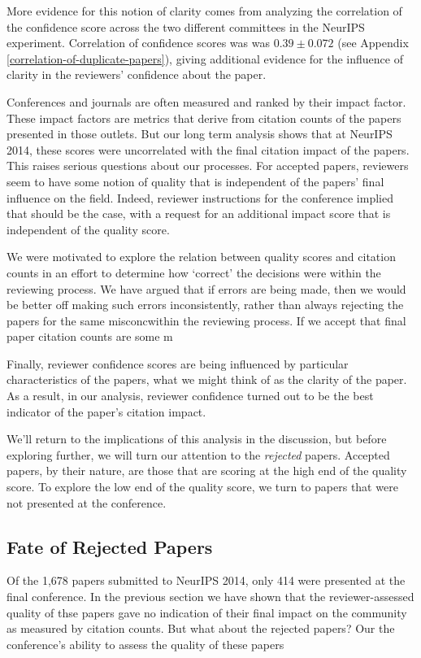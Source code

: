 \documentclass[twoside]{article}
\begin{document}
More evidence for this notion of clarity comes from analyzing the correlation of the confidence score across the two different committees in the NeurIPS experiment. Correlation of confidence scores was was $0.39 \pm 0.072$ (see Appendix \ref{correlation-of-duplicate-papers}), giving additional evidence for the influence of clarity in the reviewers' confidence about the paper.

Conferences and journals are often measured and ranked by their impact factor. These impact factors are metrics that derive from citation counts of the papers presented in those outlets. But our long term analysis shows that at NeurIPS 2014, these scores were uncorrelated with the final citation impact of the papers. This raises serious questions about our processes. For accepted papers, reviewers seem to have some notion of quality that is independent of the papers' final influence on the field. Indeed, reviewer instructions for the conference implied that should be the case, with a request for an additional impact score that is independent of the quality score.

We were motivated to explore the relation between quality scores and citation counts in an effort to determine how `correct' the decisions were within the reviewing process. We have argued that if errors are being made, then we would be better off making such errors inconsistently, rather than always rejecting the papers for the same misconcwithin the reviewing process. If we accept that final paper citation counts are some m

Finally, reviewer confidence scores are being influenced by particular characteristics of the papers, what we might think of as the clarity of the paper. As a result, in our analysis, reviewer confidence turned out to be the best indicator of the paper's citation impact.

We'll return to the implications of this analysis in the discussion, but before exploring further, we will turn our attention to the \emph{rejected} papers. Accepted papers, by their nature, are those that are scoring at the high end of the quality score. To explore the low end of the quality score, we turn to papers that were not presented at the conference.

\subsection{Fate of Rejected Papers}

Of the 1,678 papers submitted to NeurIPS 2014, only 414 were presented at the final conference. In the previous section we have shown that the reviewer-assessed quality of thse papers gave no indication of their final impact on the community as measured by citation counts. But what about the rejected papers? Our the conference's ability to assess the quality of these papers 
\end{document}
